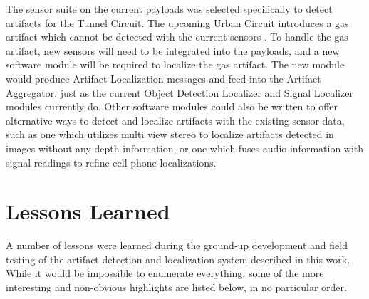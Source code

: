 The sensor suite on the current payloads was selected specifically to detect artifacts for the Tunnel Circuit. The upcoming Urban Circuit introduces a gas artifact which cannot be detected with the current sensors \cite{urban_artifacts}. To handle the gas artifact, new sensors will need to be integrated into the payloads, and a new software module will be required to localize the gas artifact. The new module would produce Artifact Localization messages and feed into the Artifact Aggregator, just as the current Object Detection Localizer and Signal Localizer modules currently do. Other software modules could also be written to offer alternative ways to detect and localize artifacts with the existing sensor data, such as one which utilizes multi view stereo to localize artifacts detected in images without any depth information, or one which fuses audio information with signal readings to refine cell phone localizations.

\section{Lessons Learned}

A number of lessons were learned during the ground-up development and field testing of the artifact detection and localization system described in this work. While it would be impossible to enumerate everything, some of the more interesting and non-obvious highlights are listed below, in no particular order.

